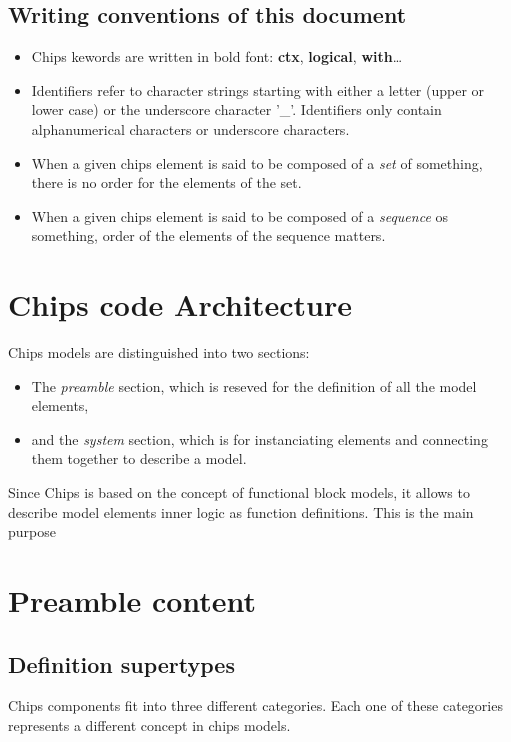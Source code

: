 \documentclass{article}
\begin{document}
\subsection*{Writing conventions of this document}

\begin{itemize}
    \item Chips kewords are written in bold font: \textbf{ctx}, \textbf{logical}, \textbf{with}\ldots
    \item Identifiers refer to character strings starting with either a letter (upper or lower case) or the underscore character '\_'. Identifiers only contain alphanumerical characters or underscore characters.
    \item When a given chips element is said to be composed of a \emph{set} of something, there is no order for the elements of the set.
    \item When a given chips element is said to be composed of a \emph{sequence} os something, order of the elements of the sequence matters.
\end{itemize}


\section{Chips code Architecture}

Chips models are distinguished into two sections:
\begin{itemize}
    \item The \emph{preamble} section, which is reseved for the definition of all the model elements,
    \item and the \emph{system} section, which is for instanciating elements and connecting them together to describe a model.
\end{itemize}

Since Chips is based on the concept of functional block models, it allows to describe model elements inner logic as function definitions. This is the main purpose

\section{Preamble content}

\subsection{Definition supertypes}
Chips components fit into three different categories. Each one of these categories represents a different concept in chips models. 
\end{document}
